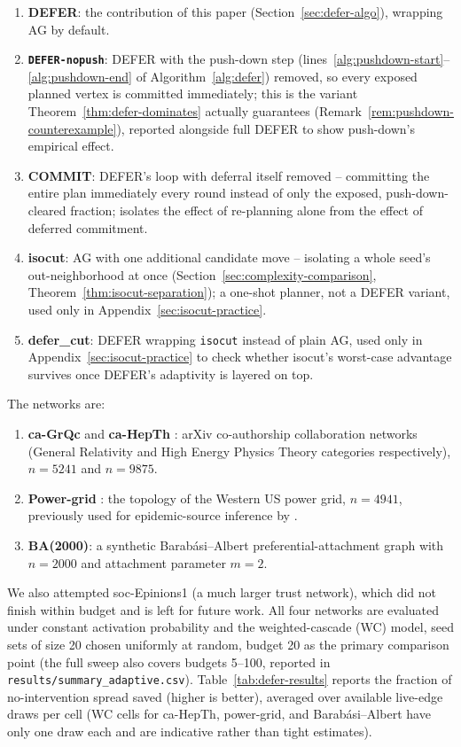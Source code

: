 \documentclass[ASNA,number]{USG}
\begin{document}
\begin{enumerate}
\item \textbf{DEFER}: the contribution of this paper (Section~\ref{sec:defer-algo}),
  wrapping AG by default.
\item \textbf{\texttt{DEFER-nopush}}: DEFER with the push-down step
  (lines~\ref{alg:pushdown-start}--\ref{alg:pushdown-end} of
  Algorithm~\ref{alg:defer}) removed, so every exposed planned vertex is
  committed immediately; this is the variant Theorem~\ref{thm:defer-dominates}
  actually guarantees (Remark~\ref{rem:pushdown-counterexample}), reported
  alongside full DEFER to show push-down's empirical effect.
\item \textbf{COMMIT}: DEFER's loop with deferral itself removed --
  committing the entire plan immediately every round instead of only the
  exposed, push-down-cleared fraction; isolates the effect of re-planning
  alone from the effect of deferred commitment.
\item \textbf{isocut}: AG with one additional candidate move -- isolating
  a whole seed's out-neighborhood at once
  (Section~\ref{sec:complexity-comparison}, Theorem~\ref{thm:isocut-separation});
  a one-shot planner, not a DEFER variant, used only in
  Appendix~\ref{sec:isocut-practice}.
\item \textbf{defer\_cut}: DEFER wrapping \texttt{isocut} instead of plain
  AG, used only in Appendix~\ref{sec:isocut-practice} to check
  whether isocut's worst-case advantage survives once DEFER's adaptivity
  is layered on top.
\end{enumerate}

\noindent The networks are:

\begin{enumerate}
\item \textbf{ca-GrQc} and \textbf{ca-HepTh} \citep{leskovec2007}: arXiv
  co-authorship collaboration networks (General Relativity and High Energy
  Physics Theory categories respectively), $n=5241$ and $n=9875$.
\item \textbf{Power-grid} \citep{watts1998}: the topology of the Western
  US power grid, $n=4941$, previously used for epidemic-source inference
  by \citet{lokhov2014}.
\item \textbf{BA(2000)}: a synthetic Barab\'asi--Albert preferential-attachment
  graph \citep{barabasi1999} with $n=2000$ and attachment parameter $m=2$.
\end{enumerate}

\noindent We also attempted soc-Epinions1 (a much larger trust network),
which did not finish within budget and is left for future work. All four
networks are evaluated under constant activation probability and the
weighted-cascade (WC) model, seed sets of size 20 chosen uniformly at
random, budget 20 as the primary comparison point (the full sweep also
covers budgets 5--100, reported in
\texttt{results/summary\_adaptive.csv}). Table~\ref{tab:defer-results}
reports the fraction of no-intervention spread saved (higher is better),
averaged over available live-edge draws per cell (WC cells for ca-HepTh,
power-grid, and Barab\'asi--Albert have only one draw each and are
indicative rather than tight estimates).
\end{document}
